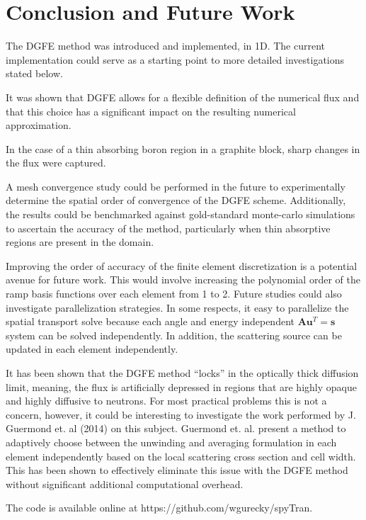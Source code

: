 \section{Conclusion and Future Work}

The DGFE method was introduced and implemented, in 1D.   The current implementation could serve as a starting point to more detailed investigations stated below.

It was shown that DGFE allows for a flexible definition of the numerical flux and that this choice has a significant impact on the resulting numerical approximation.

In the case of a thin absorbing boron region in a graphite block, sharp changes in the flux were captured.

A mesh convergence study could be performed in the future to experimentally determine the spatial order of convergence of the DGFE scheme.  Additionally, the results could be benchmarked against gold-standard monte-carlo simulations to ascertain the accuracy of the method, particularly when thin absorptive regions are present in the domain.

Improving the order of accuracy of the finite element discretization is a potential avenue for future work. This would involve increasing the polynomial order of the ramp basis functions over each element from 1 to 2. Future studies could also investigate parallelization strategies. In some respects, it easy to parallelize the spatial transport solve because each angle and energy independent $\mathbf A \mathbf u^T = \mathbf s$ system can be solved independently. In addition, the scattering source can be updated in each element independently.

It has been shown that the DGFE method ``locks'' in the optically thick diffusion limit, meaning, the flux is artificially depressed in regions that are highly opaque and highly diffusive to neutrons.  For most practical problems this is not a concern, however, it could be interesting to investigate the work performed by J. Guermond et. al (2014) \cite{Guermond2014} on this subject.  Guermond et. al. present a method to adaptively choose between the unwinding and averaging formulation in each element independently based on the local scattering cross section and cell width.  This has been shown to effectively eliminate this issue with the DGFE method without significant additional computational overhead.

The code is available online at https://github.com/wgurecky/spyTran.